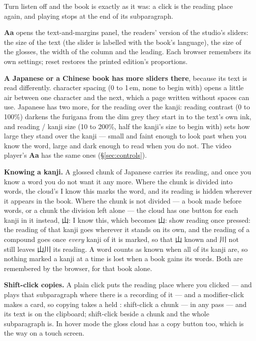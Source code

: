 \documentclass[11pt,oneside]{report}
\newcommand{\jw}[1]{\mbox{\foreignlanguage{japanese}{#1}}}
\newcommand{\key}[1]{\textsf{\small\fbox{#1}}}
\newcommand{\menu}[1]{\textsf{#1}}
\begin{document}
Turn \menu{listen} off and the book is exactly as it was: a click is the
reading place again, and playing stops at the end of its subparagraph.

\textbf{Aa} opens the text-and-margins panel, the readers' version of the
studio's sliders: the size of the text (the slider is labelled with the
book's language), the size of the glosses, the width of the column and the
leading. Each browser remembers its own settings; \menu{reset} restores the
printed edition's proportions.

\textbf{A Japanese or a Chinese book has more sliders there}, because its
text is read differently. \menu{character spacing} (0 to 1\,em, none to begin
with) opens a little air between one character and the next, which a page
written without spaces can use. Japanese has two more, for the reading over
the kanji: \menu{reading contrast} (0 to 100\%) darkens the furigana from the
dim grey they start in to the text's own ink, and \menu{reading / kanji
size} (10 to 200\%, half the kanji's size to begin with) sets how large they
stand over the kanji --- small and faint enough to look past when you know
the word, large and dark enough to read when you do not. The video player's \textbf{Aa}
has the same ones (\S\ref{sec:controls}).

\textbf{Knowing a kanji.} A glossed chunk of Japanese carries its reading,
and once you know a word you do not want it any more. Where the chunk is
divided into words, the cloud's \menu{I know this} marks the word, and its
reading is hidden wherever it appears in the book. Where the chunk is not
divided --- a book made before words, or a chunk the division left alone ---
the cloud has one button for each kanji in it instead, \jw{山}\menu{: I know
this}, which becomes \jw{山}\menu{: show reading} once pressed: the reading
of that kanji goes wherever it stands on its own, and the reading of a
compound goes once \emph{every} kanji of it is marked, so that \jw{山} known
and \jw{川} not still leaves \jw{山川} its reading. A word counts as known
when all of its kanji are, so nothing marked a kanji at a time is lost when
a book gains its words. Both are remembered by the browser, for that book
alone.

\textbf{Shift-click copies.} A plain click puts the reading place where you
clicked --- and plays that subparagraph where there is a recording of it ---
and a modifier-click makes a card, so copying takes a held \key{shift}: shift-click a chunk --- in any
pass --- and its text is on the clipboard; shift-click beside a chunk and
the whole subparagraph is. In hover mode the gloss cloud has a \menu{copy}
button too, which is the way on a touch screen.
\end{document}
